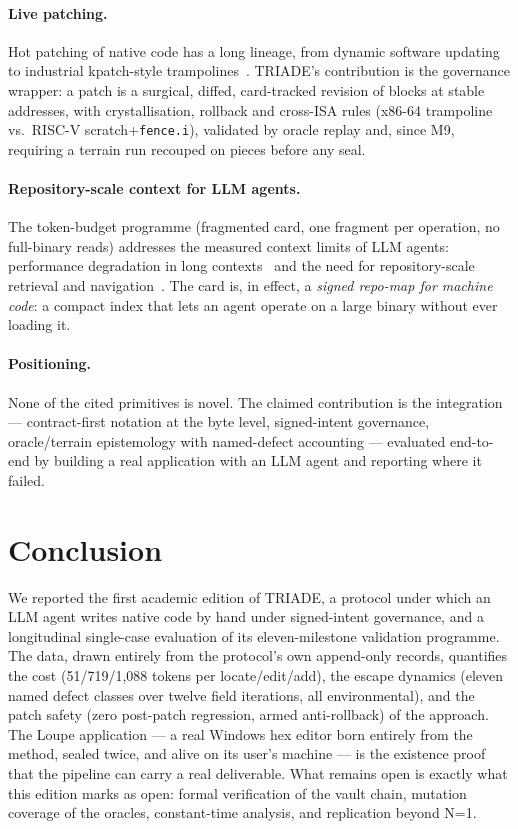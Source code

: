 \documentclass[11pt,a4paper]{article}
\newcommand{\code}[1]{\texttt{\small #1}}
\begin{document}
\paragraph{Live patching.} Hot patching of native code has a long
lineage, from dynamic software updating~\cite{hicks2002} to industrial
kpatch-style trampolines~\cite{kpatch}. TRIADE's contribution is the
governance wrapper: a patch is a surgical, diffed, card-tracked revision
of blocks at stable addresses, with crystallisation, rollback and
cross-ISA rules (x86-64 trampoline vs.\ RISC-V scratch+\code{fence.i}),
validated by oracle replay and, since M9, requiring a terrain run
recouped on pieces before any seal.

\paragraph{Repository-scale context for LLM agents.} The token-budget
programme (fragmented card, one fragment per operation, no full-binary
reads) addresses the measured context limits of LLM agents: performance
degradation in long contexts~\cite{liu2024} and the need for
repository-scale retrieval and navigation~\cite{zhang2023, jimenez2024}.
The card is, in effect, a \emph{signed repo-map for machine code}: a
compact index that lets an agent operate on a large binary without ever
loading it.

\paragraph{Positioning.} None of the cited primitives is novel. The
claimed contribution is the integration --- contract-first notation at
the byte level, signed-intent governance, oracle/terrain epistemology
with named-defect accounting --- evaluated end-to-end by building a real
application with an LLM agent and reporting where it failed.

\section{Conclusion}\label{sec:conclusion}

We reported the first academic edition of TRIADE, a protocol under which
an LLM agent writes native code by hand under signed-intent governance,
and a longitudinal single-case evaluation of its eleven-milestone
validation programme. The data, drawn entirely from the protocol's own
append-only records, quantifies the cost (51/719/1{,}088 tokens per
locate/edit/add), the escape dynamics (eleven named defect classes over
twelve field iterations, all environmental), and the patch safety (zero
post-patch regression, armed anti-rollback) of the approach. The Loupe
application --- a real Windows hex editor born entirely from the method,
sealed twice, and alive on its user's machine --- is the existence proof
that the pipeline can carry a real deliverable. What remains open is
exactly what this edition marks as open: formal verification of the vault
chain, mutation coverage of the oracles, constant-time analysis, and
replication beyond N=1.
\end{document}

